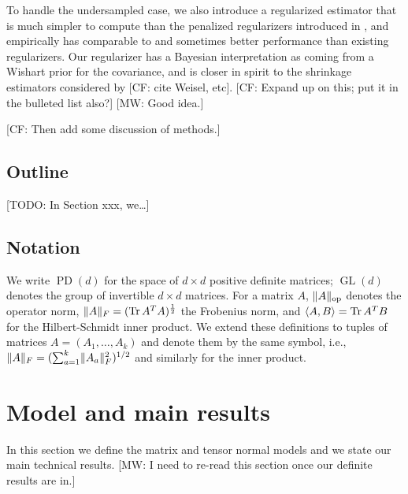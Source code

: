 \documentclass[aos]{imsart}
\theoremstyle{definition}
\numberwithin{equation}{section}
\DeclareMathOperator{\op}{op}
\DeclareMathOperator{\GL}{GL}
\DeclareMathOperator{\tr}{Tr}
\DeclareMathOperator{\PD}{PD}
\DeclarePairedDelimiter{\norm}{\lVert}{\rVert}
\newcommand{\CF}[1]{{\color{purple}[CF: #1]}}
\newcommand{\MW}[1]{{\color{red}[MW: #1]}}
\newcommand{\TODO}[1]{{\color{blue}[TODO: #1]}}
\begin{document}
To handle the undersampled case, we also introduce a regularized estimator that is much simpler to compute than the penalized regularizers introduced in \cite{tsiligkaridis2013convergence,sun2015nonconvex,zhou2014gemini}, and empirically has comparable to and sometimes better performance than existing regularizers.
Our regularizer has a Bayesian interpretation as coming from a Wishart prior for the covariance, and is closer in spirit to the shrinkage estimators considered by \CF{cite Weisel, etc}.
\CF{Expand up on this; put it in the bulleted list also?}
\MW{Good idea.}

\CF{Then add some discussion of methods.}

\subsection{Outline}
\TODO{In Section xxx, we\dots}

\subsection{Notation}
We write $\PD(d)$ for the space of $d\times d$ positive definite matrices; $\GL(d)$ denotes the group of invertible $d\times d$ matrices.
For a matrix $A$, $\norm{A}_{\op}$ denotes the operator norm, $\norm{A}_F = (\tr A^T A)^{\frac12}$ the Frobenius norm, and $\braket{A,B} = \tr A^T B$ for the Hilbert-Schmidt inner product.
We extend these definitions to tuples of matrices $A=(A_1,\dots,A_k)$ and denote them by the same symbol, i.e., $\norm{A}_F = (\sum_{a=1}^k \norm{A_a}_F^2)^{1/2}$ and similarly for the inner product.

\section{Model and main results}\label{sec:main results}
In this section we define the matrix and tensor normal models and we state our main technical results.
\MW{I need to re-read this section once our definite results are in.}
\end{document}
